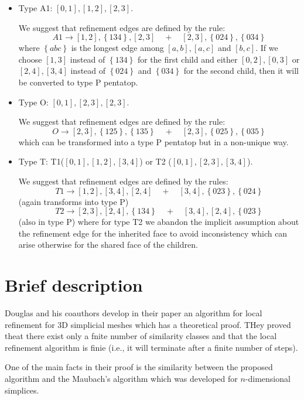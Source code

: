 \documentclass[a4paper,12pt]{amsart}
\numberwithin{equation}{section}
\begin{document}
\begin{itemize}
	\item Type A1: $[0,1], [1,2], [2,3]$.

    We suggest that refinement edges are defined by the rule:
    $$
    A1 \rightarrow [1,2], \left\{134\right\}, [2,3] \quad + \quad [2,3], \left\{024\right\}, \left\{034\right\}
    $$
    where $\left\{abc\right\}$ is the longest edge among $[a,b],[a,c]$ and $[b,c]$.
    If we choose $[1,3]$ instead of $\left\{134 \right\}$ for the first child and either $[0,2],[0,3]$ or $[2,4],[3,4]$ instead of $\left\{024 \right\}$ and $\left\{034 \right\}$ for the second child, then it will be converted to type P pentatop.
	
	
	\item Type O: $[0,1], [2,3], [2,3]$.
	
	We suggest that refinement edges are defined by the rule:
    $$
    O \rightarrow [2,3], \left\{125\right\}, \left\{135\right\} \quad + \quad [2,3], \left\{025\right\}, \left\{035\right\}
    $$
    which can be transformed into a type P pentatop but in a non-unique way.
	\item Type T: T1($[0,1], [1,2], [3,4]$) or T2 ($[0,1], [2,3], [3,4]$).
	
	We suggest that refinement edges are defined by the rules:
    $$
    T1 \rightarrow [1,2], [3,4], [2,4] \quad + \quad [3,4], \left\{023\right\}, \left\{024\right\}
    $$	
    (again transforms into type P)
    $$
    T2 \rightarrow [2,3], [2,4], \left\{134\right\} \quad + \quad [3,4], [2,4], \left\{023\right\}
    $$	
    (also in type P)
    where for type T2 we abandon the implicit assumption about the refinement edge for the inherited face to avoid inconsistency which can arise otherwise for the shared face of the children.
\end{itemize}


\section{Brief description}

Douglas and his coauthors develop in their paper an algorithm for local refinement for 3D simplicial meshes which has a theoretical proof. THey proved theat there exist only a fnite number of similarity classes and that the local refinement algorithm is finie (i.e., it will terminate after a finite number of steps).

One of the main facts in their proof is the similarity between the proposed algorithm and the Maubach's algorithm which was developed for $n$-dimensional simplices.
\end{document}
